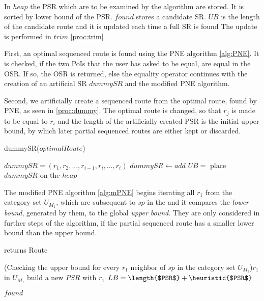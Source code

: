 \pagebreak

In $heap$ the PSR which are to be examined by the algorithm are stored. It is sorted by lower bound of the PSR. $found$ stores a candidate SR. $UB$ is the length of the candidate route and it is updated each time a full SR is found The update is performed in $trim$ \ref{proc:trim}

First, an optimal sequenced route is found using the PNE algorithm \ref{alg:PNE}. It is checked, if the two PoIs that the user has asked to be equal, are equal in the OSR. If so, the OSR is returned, else the equality operator continues with the creation of an artificial SR  $dummySR$ and the modified PNE algorithm. 

Second, we artificially create a sequenced route from the optimal route, found by PNE, as seen in \ref{proc:dummy}. The optimal route is changed, so that $r_j$ is made to be equal to $r_i$ and the length of the artificially created PSR is the initial upper bound, by which later partial sequenced routes are either kept or discarded.

\begin{procedure}[H]
	\label{proc:dummy}
	\caption{dummySR($optimalRoute$)}
	
	$dummySR = (r_1, r_2, ..., r_{i-1}, r_i, ..., r_i)$ 
	$dummySR \leftarrow add$ \;
	$UB =$ \;
	place $dummySR$ on the $heap$\;
\end{procedure}

The modified PNE algorithm \ref{alg:mPNE} begins iterating all $r_1$ from the category set $U_{M_1}$, which are subsequent to $sp$ in the and it compares the \textit{lower bound}, generated by them, to the global \textit{upper bound}. They are only considered in further steps of the algorithm, if the partial sequenced route has a smaller lower bound than the upper bound.\newline

\begin{algorithm}[H]
	\label{alg:mPNE}
	\caption{\protect\modifiedPNE returns Route}
	
	\ForEach(Checking the upper bound for every $r_1$ neighbor of $sp$ in the category set $U_{M_1}$){$r_1$ in $U_{M_1}$}{
		build a new $PSR$ with $r_1$\;
		$LB = \length{$PSR$} + \heuristic{$PSR$}$\;
	}
	
	
	\Return $found$
	
\end{algorithm}

